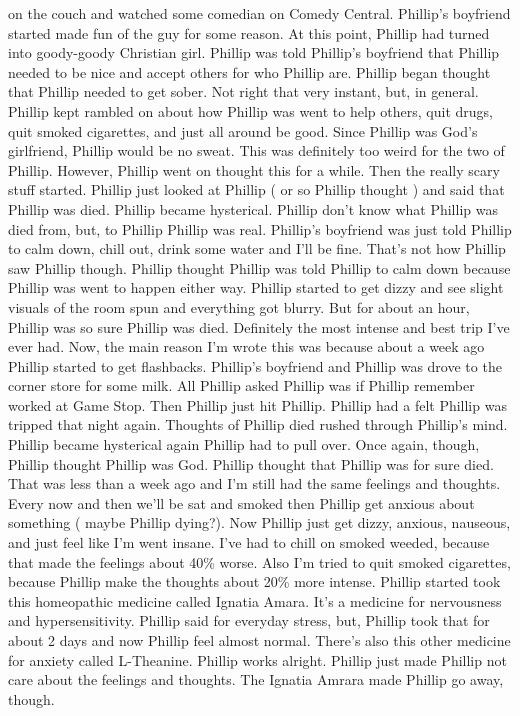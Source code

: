 \documentclass[12pt]{book}
\begin{document}
on the couch and watched some comedian on Comedy Central. Phillip's boyfriend started made fun of the guy for some reason. At this point, Phillip had turned into goody-goody Christian girl. Phillip was told Phillip's boyfriend that Phillip needed to be nice and accept others for who Phillip are. Phillip began thought that Phillip needed to get sober. Not right that very instant, but, in general. Phillip kept rambled on about how Phillip was went to help others, quit drugs, quit smoked cigarettes, and just all around be good. Since Phillip was God's girlfriend, Phillip would be no sweat. This was definitely too weird for the two of Phillip. However, Phillip went on thought this for a while. Then the really scary stuff started. Phillip just looked at Phillip ( or so Phillip thought ) and said that Phillip was died. Phillip became hysterical. Phillip don't know what Phillip was died from, but, to Phillip Phillip was real. Phillip's boyfriend was just told Phillip to calm down, chill out, drink some water and I'll be fine. That's not how Phillip saw Phillip though. Phillip thought Phillip was told Phillip to calm down because Phillip was went to happen either way. Phillip started to get dizzy and see slight visuals of the room spun and everything got blurry. But for about an hour, Phillip was so sure Phillip was died. Definitely the most intense and best trip I've ever had. Now, the main reason I'm wrote this was because about a week ago Phillip started to get flashbacks. Phillip's boyfriend and Phillip was drove to the corner store for some milk. All Phillip asked Phillip was if Phillip remember worked at Game Stop. Then Phillip just hit Phillip. Phillip had a felt Phillip was tripped that night again. Thoughts of Phillip died rushed through Phillip's mind. Phillip became hysterical again Phillip had to pull over. Once again, though, Phillip thought Phillip was God. Phillip thought that Phillip was for sure died. That was less than a week ago and I'm still had the same feelings and thoughts. Every now and then we'll be sat and smoked then Phillip get anxious about something ( maybe Phillip dying?). Now Phillip just get dizzy, anxious, nauseous, and just feel like I'm went insane. I've had to chill on smoked weeded, because that made the feelings about 40\% worse. Also I'm tried to quit smoked cigarettes, because Phillip make the thoughts about 20\% more intense. Phillip started took this homeopathic medicine called Ignatia Amara. It's a medicine for nervousness and hypersensitivity. Phillip said for everyday stress, but, Phillip took that for about 2  days and now Phillip feel almost normal. There's also this other medicine for anxiety called L-Theanine. Phillip works alright. Phillip just made Phillip not care about the feelings and thoughts. The Ignatia Amrara made Phillip go away, though.
\end{document}

